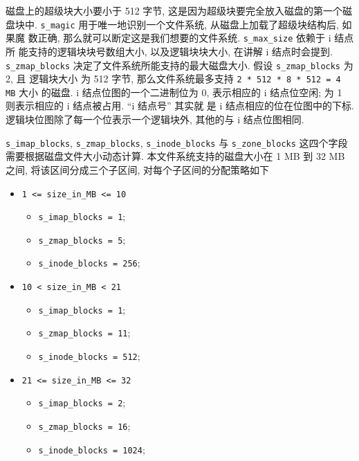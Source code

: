 \documentclass[nofonts, titlepage]{ctexart}
\begin{document}
磁盘上的超级块大小要小于 512 字节,
这是因为超级块要完全放入磁盘的第一个磁盘块中. \texttt{s\_magic}
用于唯一地识别一个文件系统, 从磁盘上加载了超级块结构后, 如果魔 数正确,
那么就可以断定这是我们想要的文件系统. \texttt{s\_max\_size} 依赖于 i
结点所 能支持的逻辑块块号数组大小, 以及逻辑块块大小, 在讲解 i
结点时会提到. \texttt{s\_zmap\_blocks}
决定了文件系统所能支持的最大磁盘大小. 假设 \texttt{s\_zmap\_blocks} 为2,
且 逻辑块大小 为 512 字节, 那么文件系统最多支持
\texttt{2 * 512 * 8 * 512 = 4 MB} 大小 的磁盘. i
结点位图的一个二进制位为 0, 表示相应的 i 结点位空闲; 为 1 则表示相应的 i
结点被占用. ``i 结点号'' 其实就 是 i 结点相应的位在位图中的下标.
逻辑块位图除了每一个位表示一个逻辑块外, 其他的与 i 结点位图相同.

\texttt{s\_imap\_blocks}, \texttt{s\_zmap\_blocks},
\texttt{s\_inode\_blocks} 与 \texttt{s\_zone\_blocks}
这四个字段需要根据磁盘文件大小动态计算. 本文件系统支持的磁盘大小在 1 MB
到 32 MB 之间, 将该区间分成三个子区间, 对每个子区间的分配策略如下
\begin{itemize}
    \item
        \texttt{1 \textless{}= size\_in\_MB \textless{}= 10}
        \begin{itemize}
            \item
                \texttt{s\_imap\_blocks = 1};
            \item \texttt{s\_zmap\_blocks = 5}; 
            \item
                \texttt{s\_inode\_blocks = 256};
        \end{itemize}
    \item
        \texttt{10 \textless{} size\_in\_MB \textless{} 21}
        \begin{itemize}
            \item
                \texttt{s\_imap\_blocks = 1}; 
            \item
                \texttt{s\_zmap\_blocks = 11};
            \item
                \texttt{s\_inode\_blocks = 512};
        \end{itemize}
    \item
        \texttt{21 \textless{}= size\_in\_MB \textless{}= 32}
        \begin{itemize}
            \item
                \texttt{s\_imap\_blocks = 2}; 
            \item
                \texttt{s\_zmap\_blocks = 16};
            \item
                \texttt{s\_inode\_blocks = 1024};
        \end{itemize}
\end{itemize}
\end{document}
